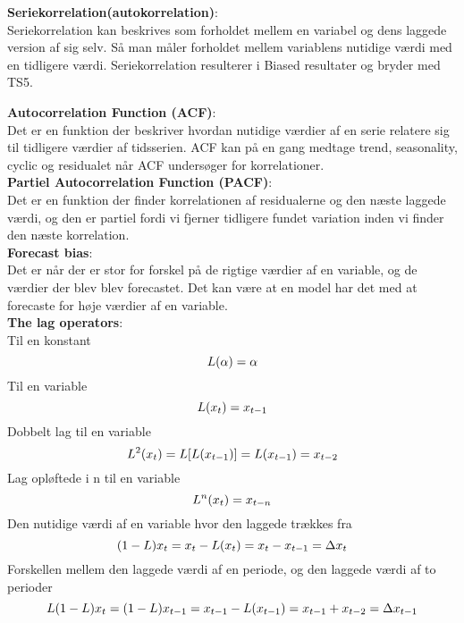 \documentclass[
  10pt,
]{article}
\begin{document}
\textbf{Seriekorrelation(autokorrelation)}:\\
Seriekorrelation kan beskrives som forholdet mellem en variabel og dens
laggede version af sig selv. Så man måler forholdet mellem variablens
nutidige værdi med en tidligere værdi. Seriekorrelation resulterer i
Biased resultater og bryder med TS5.

\textbf{Autocorrelation Function (ACF)}:\\
Det er en funktion der beskriver hvordan nutidige værdier af en serie
relatere sig til tidligere værdier af tidsserien. ACF kan på en gang
medtage trend, seasonality, cyclic og residualet når ACF undersøger for
korrelationer.\\

\textbf{Partiel Autocorrelation Function (PACF)}:\\
Det er en funktion der finder korrelationen af residualerne og den næste
laggede værdi, og den er partiel fordi vi fjerner tidligere fundet
variation inden vi finder den næste korrelation.\\

\textbf{Forecast bias}:\\
Det er når der er stor for forskel på de rigtige værdier af en variable,
og de værdier der blev blev forecastet. Det kan være at en model har det
med at forecaste for høje værdier af en variable.\\

\textbf{The lag operators}:\\
Til en konstant \begin{equation}
L(\alpha) = \alpha  \\
\end{equation} Til en variable \begin{equation}
L(x_t) = x_{t-1}  \\
\end{equation} Dobbelt lag til en variable \begin{equation}
L^2(x_t) = L[L(x_{t-1})]=L(x_{t-1})= x_{t-2} \\
\end{equation} Lag opløftede i n til en variable \begin{equation}
L^n(x_t) = x_{t-n}  \\
\end{equation} Den nutidige værdi af en variable hvor den laggede
trækkes fra \begin{equation}
(1-L)x_t = x_{t}-L(x_t)=x_t-x_{t-1}=\Delta x_t  \\
\end{equation} Forskellen mellem den laggede værdi af en periode, og den
laggede værdi af to perioder \begin{equation}
L(1-L)x_t = (1-L)x_{t-1}= x_{t-1} - L(x_{t-1}) = x_{t-1} + x_{t-2} =\Delta x_{t-1}\\
\end{equation}
\end{document}
